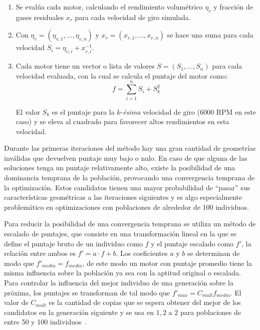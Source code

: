 \begin{enumerate}
        \item Se evalúa cada motor, calculando el rendimiento volumétrico
$\eta_{v}$ y fracción de gases residuales $x_{r}$ para cada velocidad de giro
simulada.
        \item Con $\eta_{v} = (\eta_{v,1}, \ldots ,\eta_{v,n})$ y
$x_{r}=(x_{r,1},\ldots,x_{r,n})$ se hace una suma para cada velocidad
$S_{i}=\eta_{v,i} + x_{r,i}^{-1}$.
        \item Cada motor tiene un vector o lista de valores
$S = (S_{1},\ldots,S_{n})$ para cada velocidad evaluada, con la cual se calcula
el puntaje del motor como:
        \begin{equation}
        f = \sum_{i=1}^{n}{S_{i}} + S_{k}^{2}
      \end{equation}

El valor $S_{k}$ es el puntaje para la $k$-\textit{ésima} velocidad de giro (6000 RPM en
este caso) y se eleva al cuadrado para favorecer altos rendimientos en esta
velocidad.
\end{enumerate}


Durante las primeras iteraciones del método hay una gran cantidad de geometrías
inválidas que devuelven puntaje muy bajo o nulo.
%
En caso de que alguna de las soluciones tenga un puntaje relativamente alto,
existe la posibilidad de una dominancia temprana de la población, provocando
una convergencia temprana de la optimización.
%
Estos candidatos tienen una mayor probabilidad de ``pasar'' sus características
geométricas a las iteraciones siguientes y es algo especialmente problemático en
optimizaciones con poblaciones de alrededor de 100 individuos.

Para reducir la posibilidad de una convergencia temprana se utiliza un método de
escalado de puntajes, que consiste en una transformación lineal en la que se
define el puntaje bruto de un individuo como $f$ y el puntaje escalado como
$f'$, la relación entre ambos es $f' = a\cdot f + b$.
%
Los coeficientes $a$ y $b$ se determinan de modo que $f'_{media}=f_{media}$, de
este modo un motor con puntaje promedio tiene la misma influencia sobre la
población ya sea con la aptitud original o escalada.
%
Para controlar la influencia del mejor individuo de una generación sobre la
próxima, los puntajes se transforman de tal modo que
$f'_{max}=C_{mult}f_{media}$.
%
El valor de $C_{mult}$ es la cantidad de copias que se espera obtener del mejor
de los candidatos en la generación siguiente y se usa en $1,2$ a $2$ para
poblaciones de entre 50 y 100 individuos~\parencite{goldberg}.


